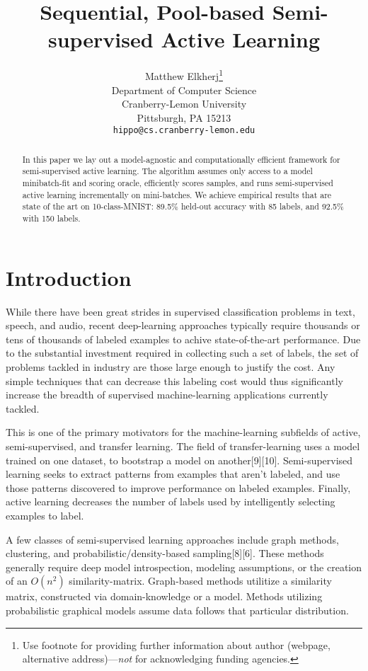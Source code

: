 \documentclass{article}
\title{Sequential, Pool-based Semi-supervised Active Learning}
\author{
  Matthew Elkherj\thanks{Use footnote for providing further
    information about author (webpage, alternative
    address)---\emph{not} for acknowledging funding agencies.} \\
  Department of Computer Science\\
  Cranberry-Lemon University\\
  Pittsburgh, PA 15213 \\
  \texttt{hippo@cs.cranberry-lemon.edu} \\
}
\begin{document}

\maketitle

\begin{abstract}
In this paper we lay out a model-agnostic and computationally efficient framework for semi-supervised active learning.  The algorithm assumes only access to a model minibatch-fit and scoring oracle, efficiently scores samples, and runs semi-supervised active learning incrementally on mini-batches.  We achieve empirical results that are state of the art on 10-class-MNIST: 89.5\% held-out accuracy with 85 labels, and 92.5\% with 150 labels.  
\end{abstract}

\section{Introduction}
While there have been great strides in supervised classification problems in text, speech, and audio, recent deep-learning approaches typically require thousands or tens of thousands of labeled examples to achive state-of-the-art performance.  Due to the substantial investment required in collecting such a set of labels, the set of problems tackled in industry are those large enough to justify the cost.  Any simple techniques that can decrease this labeling cost would thus significantly increase the breadth of supervised machine-learning applications currently tackled.  

This is one of the primary motivators for the machine-learning subfields of active, semi-supervised, and transfer learning.  The field of transfer-learning uses a model trained on one dataset, to bootstrap a model on another[9][10].  Semi-supervised learning seeks to extract patterns from examples that aren't labeled, and use those patterns discovered to improve performance on labeled examples.  Finally, active learning decreases the number of labels used by intelligently selecting examples to label.  

A few classes of semi-supervised learning approaches include graph methods, clustering, and probabilistic/density-based sampling[8][6].  These methods generally require deep model introspection, modeling assumptions, or the creation of an $O(n^2)$ similarity-matrix.  Graph-based methods utilitize a similarity matrix, constructed via domain-knowledge or a model.  Methods utilizing probabilistic graphical models assume data follows that particular distribution.  
\end{document}
